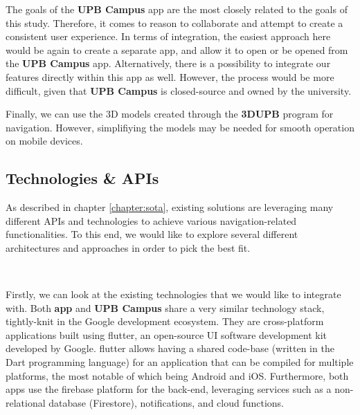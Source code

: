        The goals of the \textbf{UPB Campus} app are the most closely related to the goals of this study. Therefore, it comes to reason to collaborate and attempt to create a consistent user experience. In terms of integration, the easiest approach here would be again to create a separate app, and allow it to open or be opened from the \textbf{UPB Campus} app. Alternatively, there is a possibility to integrate our features directly within this app as well. However, the process would be more difficult, given that \textbf{UPB Campus} is closed-source and owned by the university.
        
        Finally, we can use the 3D models created through the \textbf{3DUPB} program for navigation. However, simplifiying the models may be needed for smooth operation on mobile devices.
    
    \subsection{Technologies \& APIs} \label{3:technologies_and_apis}
        
        As described in chapter \ref{chapter:sota}, existing solutions are leveraging many different APIs and technologies to achieve various navigation-related functionalities. To this end, we would like to explore several different architectures and approaches in order to pick the best fit.
        
        ~
        
        Firstly, we can look at the existing technologies that we would like to integrate with. Both \textbf{\gls{app}} and \textbf{UPB Campus} share a very similar technology stack, tightly-knit in the Google development ecosystem. They are cross-platform applications built using \gls{flutter}, an open-source UI software development kit developed by Google. \gls{flutter} allows having a shared code-base (written in the Dart programming language) for an application that can be compiled for multiple platforms, the most notable of which being Android and iOS. Furthermore, both apps use the \gls{firebase} platform for the back-end, leveraging services such as a non-relational database (Firestore), notifications, and cloud functions.
        
        ~
        

